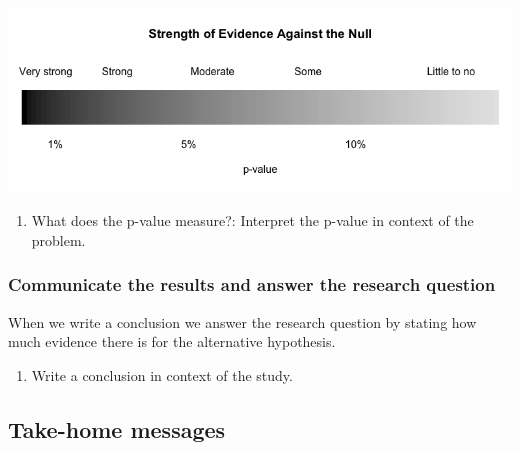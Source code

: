 \documentclass[
]{report}
\providecommand{\tightlist}{%
  \setlength{\itemsep}{0pt}\setlength{\parskip}{0pt}}
\begin{document}
\begin{center}\includegraphics[width=0.9\linewidth]{images/soe_gradient_grayscale} \end{center}

\begin{enumerate}
\def\labelenumi{\arabic{enumi}.}
\setcounter{enumi}{24}
\tightlist
\item
  What does the p-value measure?: Interpret the p-value in context of the problem.
\end{enumerate}

\vspace{1in}

\hypertarget{communicate-the-results-and-answer-the-research-question}{%
\subsubsection*{Communicate the results and answer the research question}\label{communicate-the-results-and-answer-the-research-question}}

When we write a conclusion we answer the research question by stating how much evidence there is for the alternative hypothesis.

\begin{enumerate}
\def\labelenumi{\arabic{enumi}.}
\setcounter{enumi}{25}
\tightlist
\item
  Write a conclusion in context of the study.
\end{enumerate}

\vspace{1in}

\hypertarget{take-home-messages-9}{%
\subsection{Take-home messages}\label{take-home-messages-9}}
\end{document}
